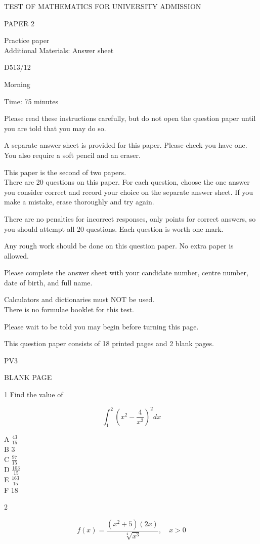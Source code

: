 \documentclass[10pt]{article}
\begin{document}
TEST OF MATHEMATICS FOR UNIVERSITY ADMISSION

PAPER 2

Practice paper\\
Additional Materials: Answer sheet

D513/12

Morning

Time: 75 minutes

Please read these instructions carefully, but do not open the question paper until you are told that you may do so.

A separate answer sheet is provided for this paper. Please check you have one. You also require a soft pencil and an eraser.

This paper is the second of two papers.\\
There are 20 questions on this paper. For each question, choose the one answer you consider correct and record your choice on the separate answer sheet. If you make a mistake, erase thoroughly and try again.

There are no penalties for incorrect responses, only points for correct answers, so you should attempt all 20 questions. Each question is worth one mark.

Any rough work should be done on this question paper. No extra paper is allowed.

Please complete the answer sheet with your candidate number, centre number, date of birth, and full name.

Calculators and dictionaries must NOT be used.\\
There is no formulae booklet for this test.

Please wait to be told you may begin before turning this page.

This question paper consists of 18 printed pages and 2 blank pages.

PV3

BLANK PAGE

1 Find the value of

$$
\int_{1}^{2}\left(x^{2}-\frac{4}{x^{2}}\right)^{2} d x
$$

A $\frac{43}{15}$\\
B 3\\
C $\frac{97}{15}$\\
D $\frac{103}{15}$\\
E $\frac{163}{15}$\\
F 18

2

$$
f(x)=\frac{\left(x^{2}+5\right)(2 x)}{\sqrt[4]{x^{3}}}, \quad x>0
$$
\end{document}
